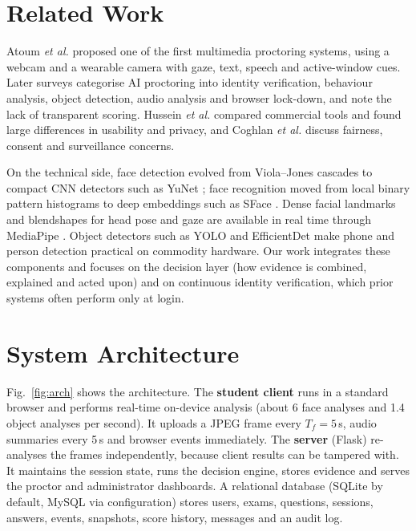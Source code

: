 \documentclass[conference]{IEEEtran}
\begin{document}
\section{Related Work}
Atoum \emph{et al.} \cite{atoum2017automated} proposed one of the first multimedia proctoring systems, using a webcam and a wearable camera with gaze, text, speech and active-window cues. Later surveys \cite{nigam2021review} categorise AI proctoring into identity verification, behaviour analysis, object detection, audio analysis and browser lock-down, and note the lack of transparent scoring. Hussein \emph{et al.} \cite{hussein2020evaluation} compared commercial tools and found large differences in usability and privacy, and Coghlan \emph{et al.} \cite{coghlan2021ethics} discuss fairness, consent and surveillance concerns.

On the technical side, face detection evolved from Viola--Jones cascades \cite{viola2001rapid} to compact CNN detectors such as YuNet \cite{wu2023yunet}; face recognition moved from local binary pattern histograms \cite{ahonen2006lbp} to deep embeddings such as SFace \cite{zhong2021sface}. Dense facial landmarks and blendshapes for head pose and gaze are available in real time through MediaPipe \cite{lugaresi2019mediapipe,kartynnik2019facemesh}. Object detectors such as YOLO \cite{redmon2016yolo,jocher2023yolov8} and EfficientDet \cite{tan2020efficientdet} make phone and person detection practical on commodity hardware. Our work integrates these components and focuses on the decision layer (how evidence is combined, explained and acted upon) and on continuous identity verification, which prior systems often perform only at login.

\section{System Architecture}
Fig.~\ref{fig:arch} shows the architecture. The \textbf{student client} runs in a standard browser and performs real-time on-device analysis (about 6 face analyses and 1.4 object analyses per second). It uploads a JPEG frame every $T_f=5$\,s, audio summaries every 5\,s and browser events immediately. The \textbf{server} (Flask) re-analyses the frames independently, because client results can be tampered with. It maintains the session state, runs the decision engine, stores evidence and serves the proctor and administrator dashboards. A relational database (SQLite by default, MySQL via configuration) stores users, exams, questions, sessions, answers, events, snapshots, score history, messages and an audit log.
\end{document}
